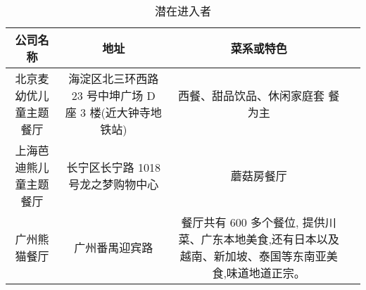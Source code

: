 \begin{table}[ htbp ]
\caption{潜在进入者}
\centering
\begin{tabular}{|c|c|c|p{5cm}|}
\hline
       公司名称        &       地址            &                菜系或特色\\
\hline
北京麦幼优儿童主题餐厅 &海淀区北三环西路 23 号中坤广场 D 座 3 楼(近大钟寺地铁站) 
&西餐、甜品饮品、休闲家庭套 餐为主\\
\hline
上海芭迪熊儿童主题餐厅 &长宁区长宁路 1018 号龙之梦购物中心&蘑菇房餐厅\\
\hline
广州熊猫餐厅&广州番禺迎宾路&餐厅共有 600 多个餐位,
提供川菜、广东本地美食,还有日本以及越南、新加坡、泰国等东南亚美食,味道地道正宗。\\
\hline
\end{tabular}
\end{table}



